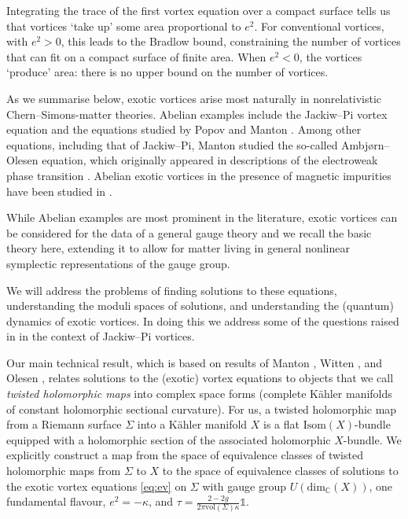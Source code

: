 \documentclass[10pt]{article}
\theoremstyle{definition}
\begin{document}
Integrating the trace of the first vortex equation over a compact surface tells us that vortices `take up' some area proportional to \(e^2\). For conventional vortices, with \(e^2 > 0\), this leads to the Bradlow bound, constraining the number of vortices that can fit on a compact surface of finite area. When \(e^2 <0\), the vortices `produce' area: there is no upper bound on the number of vortices. 
 

As we summarise below, exotic vortices arise most naturally in nonrelativistic Chern--Simons-matter theories. Abelian examples include the Jackiw--Pi vortex equation \cite{jackiwSSS} and the equations studied by Popov \cite{popovIV} and Manton \cite{mantonPV,mantonFVE}. Among other equations, including that of Jackiw--Pi, Manton studied the so-called Ambj\o rn--Olesen equation, which originally appeared in descriptions of the electroweak phase transition \cite{ambjornAS,ambjornMCS,ambjornCS}. Abelian exotic vortices in the presence of magnetic impurities have been studied in \cite{gudnasonMI}.


While Abelian examples are most prominent in the literature, exotic vortices can be considered for the data of a general gauge theory \cite{dunneSCS,turnerQO} and we recall the basic theory here, extending it to allow for matter living in general nonlinear symplectic representations of the gauge group. 


We will address the problems of finding solutions to these equations, understanding the moduli spaces of solutions, and understanding the (quantum) dynamics of exotic vortices. In doing this we address some of the questions raised in \cite{doroudSA} in the context of Jackiw--Pi vortices. 

Our main technical result, which is based on results of Manton \cite{mantonFVE}, Witten \cite{wittenMPS}, and Olesen \cite{olesenSC}, relates solutions to the (exotic) vortex equations to objects that we call \emph{twisted holomorphic maps} into complex space forms (complete K\"ahler manifolds of constant holomorphic sectional curvature). For us, a twisted holomorphic map from a Riemann surface \(\Sigma\) into a K\"ahler manifold \(X\) is a flat \(\text{Isom}(X)\)-bundle equipped with a holomorphic section of the associated holomorphic \(X\)-bundle. We explicitly construct a map from the space of equivalence classes of twisted holomorphic maps from \(\Sigma\) to \(X\) to the space of equivalence classes of solutions to the exotic vortex equations \eqref{eq:ev} on \(\Sigma\) with gauge group \(U(\text{dim}_\mathbb{C}(X))\), one fundamental flavour, \(e^2 = -\kappa\), and \(\tau = \frac{2-2g}{2\pi \text{vol}(\Sigma) \kappa} \mathbb{1}\). 
\end{document}
